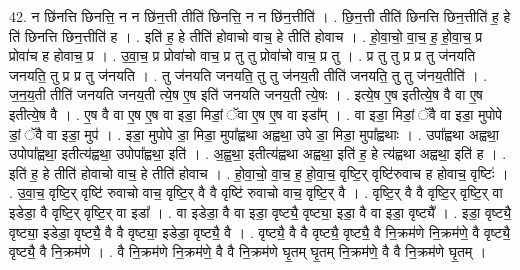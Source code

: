 \documentclass[17pt]{extarticle}
\begin{document}
42. न छि॑नत्ति छिनत्ति॒ न न छि॑न॒त्ती तीति॑ छिनत्ति॒ न न छि॑न॒त्तीति॑ । . छि॒न॒त्ती तीति॑ छिनत्ति छिन॒त्तीति॑ ह॒ हे ति॑ छिनत्ति छिन॒त्तीति॑ ह । . इति॑ ह॒ हे तीति॑ होवाचो वाच॒ हे तीति॑ होवाच । . हो॒वा॒चो॒ वा॒च॒ ह॒ हो॒वा॒च॒ प्र प्रोवा॑च ह होवाच॒ प्र । . उ॒वा॒च॒ प्र प्रोवा॑चो वाच॒ प्र तु तु प्रोवा॑चो वाच॒ प्र तु । . प्र तु तु प्र प्र तु ज॑नयति जनयति॒ तु प्र प्र तु ज॑नयति । . तु ज॑नयति जनयति॒ तु तु ज॑नय॒ती तीति॑ जनयति॒ तु तु ज॑नय॒तीति॑ । . ज॒न॒य॒ती तीति॑ जनयति जनय॒ती त्ये॒ष ए॒ष इति॑ जनयति जनय॒ती त्ये॒षः । . इत्ये॒ष ए॒ष इतीत्ये॒ष वै वा ए॒ष इतीत्ये॒ष वै । . ए॒ष वै वा ए॒ष ए॒ष वा इडा॒ मिडां॒ ॅवा ए॒ष ए॒ष वा इडा᳚म् । . वा इडा॒ मिडां॒ ॅवै वा इडा॒ मुपोपे डां॒ ॅवै वा इडा॒ मुप॑ । . इडा॒ मुपोपे डा॒ मिडा॒ मुपा᳚ह्वथा अह्वथा॒ उपे डा॒ मिडा॒ मुपा᳚ह्वथाः । . उपा᳚ह्वथा अह्वथा॒ उपोपा᳚ह्वथा॒ इतीत्य॑ह्वथा॒ उपोपा᳚ह्वथा॒ इति॑ । . अ॒ह्व॒था॒ इतीत्य॑ह्वथा अह्वथा॒ इति॑ ह॒ हे त्य॑ह्वथा अह्वथा॒ इति॑ ह । . इति॑ ह॒ हे तीति॑ होवाचो वाच॒ हे तीति॑ होवाच । . हो॒वा॒चो॒ वा॒च॒ ह॒ हो॒वा॒च॒ वृष्टि॒र् वृष्टि॑रुवाच ह होवाच॒ वृष्टिः॑ । . उ॒वा॒च॒ वृष्टि॒र् वृष्टि॑ रुवाचो वाच॒ वृष्टि॒र् वै वै वृष्टि॑ रुवाचो वाच॒ वृष्टि॒र् वै । . वृष्टि॒र् वै वै वृष्टि॒र् वृष्टि॒र् वा इडेडा॒ वै वृष्टि॒र् वृष्टि॒र् वा इडा᳚ । . वा इडेडा॒ वै वा इडा॒ वृष्ट्यै॒ वृष्ट्या॒ इडा॒ वै वा इडा॒ वृष्ट्यै᳚ । . इडा॒ वृष्ट्यै॒ वृष्ट्या॒ इडेडा॒ वृष्ट्यै॒ वै वै वृष्ट्या॒ इडेडा॒ वृष्ट्यै॒ वै । . वृष्ट्यै॒ वै वै वृष्ट्यै॒ वृष्ट्यै॒ वै नि॒क्रम॑णे नि॒क्रम॑णे॒ वै वृष्ट्यै॒ वृष्ट्यै॒ वै नि॒क्रम॑णे । . वै नि॒क्रम॑णे नि॒क्रम॑णे॒ वै वै नि॒क्रम॑णे घृ॒तम् घृ॒तम् नि॒क्रम॑णे॒ वै वै नि॒क्रम॑णे घृ॒तम् । \newline
\end{document}
